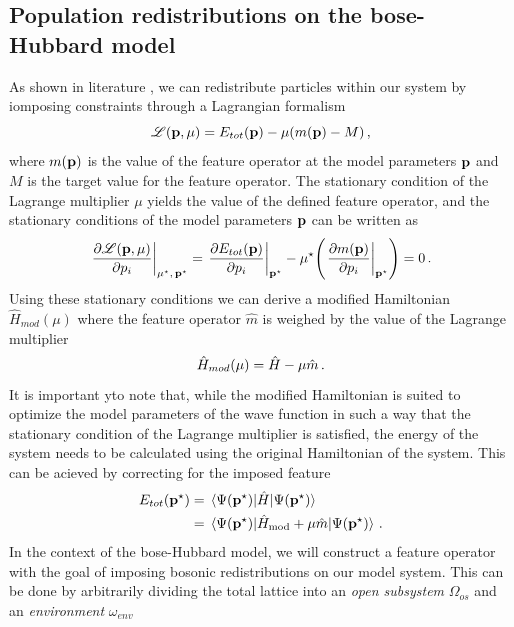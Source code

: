 \documentclass[twoside,twocolumn,9pt]{article}
\begin{document}
\subsection{Population redistributions on the bose-Hubbard model}
As shown in literature \cite{devriendt2021, devriendt2022}, we can redistribute particles within our system by iomposing constraints through a Lagrangian formalism \cite{mukherji1963, zeiss1983, kaduk2011}
\begin{equation}
  \mathscr{L}(\vb{p}, \mu)
        = E_{tot}(\vb{p})
        - \mu ( m(\vb{p}) - M )
        \thinspace ,
\end{equation} 
where $m(\vb{p})$ is the value of the feature operator at the model parameters $\vb{p}$ and $M$ is the target value for the feature operator. The stationary condition of the Lagrange multiplier $\mu$ yields the value of the defined feature operator, and the stationary conditions of the model parameters $\vb{p}$ can be written as
\begin{equation}
  \eval{
    \pdv{
        \mathscr{L}(\vb{p}, \mu)
    }{p_i}
}_{\mu^\star, \thinspace \vb{p}^\star}
= \eval{
    \pdv{
        E_{tot}(\vb{p})
    }{p_i}
}_{\vb{p}^\star}
- \mu^\star \qty( 
    \eval{
        \pdv{
            m(\vb{p})
        }{p_i}
    }_{\vb{p}^\star}
)
= 0
\thinspace .
\label{eq:stationary_condition_model_parameters}
\end{equation}
Using these stationary conditions we can derive a modified Hamiltonian $\hat{H}_{mod}(\mu)$ where the feature operator $\hat{m}$ is weighed by the value of the Lagrange multiplier
\begin{equation}
  \hat{H}_{mod}(\mu) = \hat{H} - \mu \hat{m} \thinspace .
  \label{eq:modified-hamiltonian}
\end{equation}
It is important yto note that, while the modified Hamiltonian is suited to optimize the model parameters of the wave function in such a way that the stationary condition of the Lagrange multiplier is satisfied, the energy of the system needs to be calculated using the original Hamiltonian of the system. This can be acieved by correcting for the imposed feature
\begin{align}
  \begin{split}
    E_{tot}(\vb{p}^\star)
    &= \ev*{\hat{H}}{\Psi(\vb{p}^\star)} \\ 
    &= \ev*{\hat{H}_{\text{mod}} + \mu\hat{m}}{\Psi(\vb{p}^\star)}
    \thinspace .
  \end{split}
\end{align}
In the context of the bose-Hubbard model, we will construct a feature operator with the goal of imposing bosonic redistributions on our model system. This can be done by arbitrarily dividing the total lattice into an \emph{open subsystem} $\Omega_{os}$ and an \emph{environment} $\omega_{env}$
\end{document}

